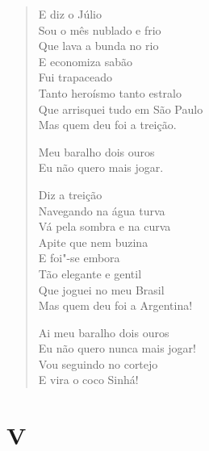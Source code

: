 \begin{verse}
E diz o Júlio\\
Sou o mês nublado e frio\\
Que lava a bunda no rio\\
E economiza sabão\\
Fui trapaceado\\
Tanto heroísmo tanto estralo\\
Que arrisquei tudo em São Paulo\\
Mas quem deu foi a treição.

\qquad\qquad\quad Meu baralho dois ouros\\
\qquad\qquad\quad Eu não quero mais jogar.

Diz a treição\\
Navegando na água turva\\
Vá pela sombra e na curva\\
Apite que nem buzina\\
E foi"-se embora\\
Tão elegante e gentil\\
Que joguei no meu Brasil\\
Mas quem deu foi a Argentina!

\qquad\qquad\quad Ai meu baralho dois ouros\\
\qquad\quad Eu não quero nunca mais jogar!\\
\quad Vou seguindo no cortejo\\
E vira o coco Sinhá!
\end{verse}

\pagebreak
\section*{V}


